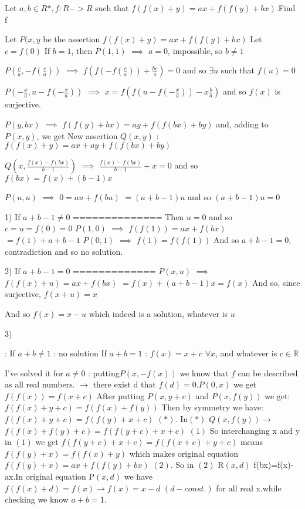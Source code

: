 \begin{solution}
	\begin{tcolorbox}Let $a,b \in R*,f:R->R$ such that $f(f(x)+y)=ax+f(f(y)+bx)$.Find f\end{tcolorbox}
Let $P(x,y$ be the assertion $f(f(x)+y)=ax+f(f(y)+bx)$
Let $c=f(0)$
If $b=1$, then $P(1,1)$ $\implies$ $a=0$, impossible, so $b\ne 1$

$P(\frac ca,-f(\frac ca))$ $\implies$ $f(f(-f(\frac ca))+\frac {bc}a)=0$ and so $\exists u$ such that $f(u)=0$

$P(-\frac xa, u-f(-\frac xa))$ $\implies$ $x=f(f(u-f(-\frac xa))-x\frac ba)$ and so $f(x)$ is surjective.

$P(y,bx)$ $\implies$ $f(f(y)+bx)=ay+f(f(bx)+by)$ and, adding to $P(x,y)$, we get
New assertion $Q(x,y)$ : $f(f(x)+y)=ax+ay+f(f(bx)+by)$

$Q(x,\frac{f(x)-f(bx)}{b-1})$ $\implies$ $\frac{f(x)-f(bx)}{b-1}+x=0$ and so $f(bx)=f(x)+(b-1)x$

$P(u,u)$ $\implies$ $0=au+f(bu)$ $=(a+b-1)u$  and so $(a+b-1)u=0$

1) If $a+b-1\ne 0$
==============
Then $u=0$ and so $c=u=f(0)=0$
$P(1,0)$ $\implies$ $f(f(1))=ax+f(bx)$ $=f(1)+a+b-1$
$P(0,1)$ $\implies$ $f(1)=f(f(1))$
And so $a+b-1=0$, contradiction and so no solution.

2) If $a+b-1=0$
=============
$P(x,u)$  $\implies$ $f(f(x)+u)=ax+f(bx)$ $=f(x)+(a+b-1)x=f(x)$
And so, since surjective, $f(x+u)=x$

And so $f(x)=x-u$ which indeed is a solution, whatever is $u$

3)  :
If $a+b\ne 1$ : no solution
If $a+b=1$ : $f(x)=x+c$ $\forall x$, and whatever is $c\in\mathbb R$
\end{solution}



\begin{solution}
	I've solved it for $a\neq0$ : putting$P(x,-f(x))$ we know that $f$ can be described as all real numbers. $\to$ there exist d that $f(d)=0$.$P(0,x)$ we get $f(f(x))=f(x+c)$  After putting $P(x,y+c)$ and $P(x,f(y))$ we get: $f(f(x)+y+c)=f(f(x)+f(y))$  
Then by symmetry we have: $f(f(x)+y+c)=f(f(y)+x+c)$  $(*)$. In$(*)$ $Q(x,f(y)) \to$  $f(f(x)+f(y)+c)=f(f(y+c)+x+c)$ $(1)$
So interchanging x and y in $(1)$ we get $f(f(y+c)+x+c)=f(f(x+c)+y+c)$  means $f(f(y)+x)=f(f(x)+y)$  which makes original equation $f(f(y)+x)=ax+f(f(y)+bx)$ $(2)$. So in  $(2)$ R$(x,d)$ f(bx)=f(x)-ax.In original equation P$(x,d)$ we have $f(f(x)+d)=f(x) \to f(x)=x-d$ $(d-const.)$ for all real x.while checking we know $a+b=1$.
\end{solution}



